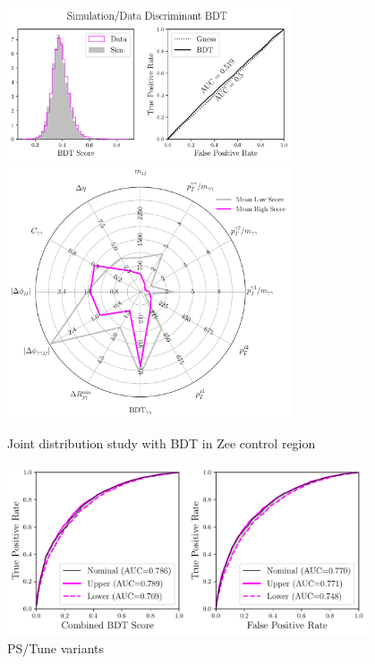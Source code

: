 \begin{figure}[h!]
    \includegraphics[width=0.75\textwidth]{figures/event_selection/eng_feature_ROC_Zee_BDT.pdf}
    \includegraphics[width=0.75\textwidth]{figures/event_selection/eng_feature_radar_Zee_BDT.pdf}
    \caption{Joint distribution study with BDT in Zee control region}
    \label{fig:event_categorisation:zee_bdt_validation}
\end{figure}

\begin{figure}[h!]
    \begin{center}
        \includegraphics[width=0.95\textwidth]{figures/event_selection/psvar_ROCs_PS.pdf}
    \end{center}
    \caption{PS/Tune variants}
    \label{fig:event_categorisation:ps_variant_validation}
\end{figure}





